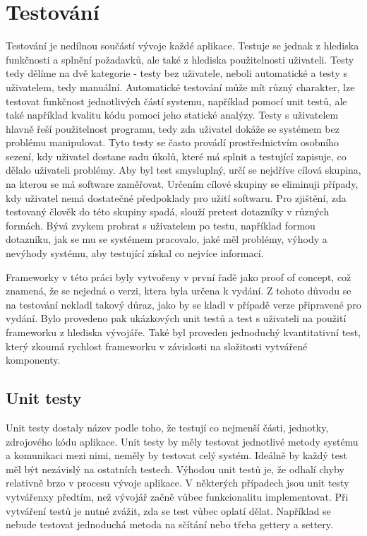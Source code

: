 \chapter{Testování}
Testování je nedílnou součástí vývoje každé aplikace. Testuje se jednak z hlediska funkčnosti a splnění požadavků, ale také z hlediska použitelnosti uživateli. Testy tedy dělíme na dvě kategorie - testy bez uživatele, neboli automatické a testy s uživatelem, tedy manuální.  Automatické testování může mít různý charakter, lze testovat funkčnost jednotlivých částí systemu, například pomocí unit testů, ale také například kvalitu kódu pomoci jeho statické analýzy. Testy s uživatelem hlavně řeší použitelnost programu, tedy zda uživatel dokáže se systémem bez problému manipulovat. Tyto testy se často provádí prostřednictvím osobního sezení, kdy uživatel dostane sadu úkolů, které má splnit a testující zapisuje, co dělalo uživateli problémy. Aby byl test smysluplný, určí se nejdříve cílová skupina, na kterou se má software zaměřovat. Určením cílové skupiny se eliminuji případy, kdy uživatel nemá dostatečné předpoklady pro užití softwaru. Pro zjištění, zda testovaný člověk do této skupiny spadá, slouží pretest dotazníky v různých formách. Bývá zvykem probrat s uživatelem po testu, například formou dotazníku, jak se mu se systémem pracovalo, jaké měl problémy, výhody a nevýhody systému, aby testující získal co nejvíce informací.  

Frameworky v této práci byly vytvořeny v první řadě jako proof of concept, což znamená, že se nejedná o verzi, ktera byla určena k vydání. Z tohoto důvodu se na testování nekladl takový důraz, jako by se kladl v případě verze připravené pro vydání. Bylo provedeno pak ukázkových unit testů a test s uživateli na použití frameworku z hlediska vývojáře. Také byl proveden jednoduchý kvantitativní test, který zkoumá rychlost frameworku v závislosti na složitosti vytvářené komponenty.

\section{Unit testy} 
Unit testy dostaly název podle toho, že testují co nejmenší části, jednotky, zdrojového kódu aplikace. Unit testy by měly testovat jednotlivé metody systému a komunikaci mezi nimi, neměly by testovat celý systém. Ideálně by každý test měl být nezávislý na ostatních testech. Výhodou unit testů je, že odhalí chyby relativně brzo v procesu vývoje aplikace. V některých případech jsou unit testy vytvářenxy předtím, než vývojář začně vůbec funkcionalitu implementovat. Při vytváření testů je nutné zvážit, zda se test vůbec oplatí dělat. Například se nebude testovat jednoduchá metoda na sčítání nebo třeba gettery a settery.

